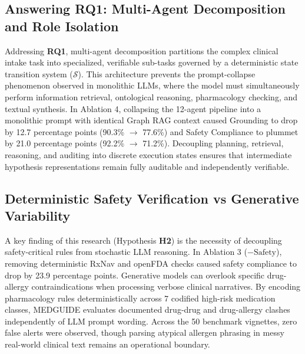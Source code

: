 \documentclass[journal,10pt,twocolumn]{IEEEtran}
\begin{document}
\subsection{Answering RQ1: Multi-Agent Decomposition and Role Isolation}
Addressing \textbf{RQ1}, multi-agent decomposition partitions the complex clinical intake task into specialized, verifiable sub-tasks governed by a deterministic state transition system ($\mathcal{S}$). This architecture prevents the prompt-collapse phenomenon observed in monolithic LLMs, where the model must simultaneously perform information retrieval, ontological reasoning, pharmacology checking, and textual synthesis. In Ablation 4, collapsing the 12-agent pipeline into a monolithic prompt with identical Graph RAG context caused Grounding to drop by 12.7 percentage points (90.3\% $\to$ 77.6\%) and Safety Compliance to plummet by 21.0 percentage points (92.2\% $\to$ 71.2\%). Decoupling planning, retrieval, reasoning, and auditing into discrete execution states ensures that intermediate hypothesis representations remain fully auditable and independently verifiable.

\subsection{Deterministic Safety Verification vs Generative Variability}
A key finding of this research (Hypothesis \textbf{H2}) is the necessity of decoupling safety-critical rules from stochastic LLM reasoning. In Ablation 3 ($- \text{Safety}$), removing deterministic RxNav and openFDA checks caused safety compliance to drop by 23.9 percentage points. Generative models can overlook specific drug-allergy contraindications when processing verbose clinical narratives. By encoding pharmacology rules deterministically across 7 codified high-risk medication classes, MEDGUIDE evaluates documented drug-drug and drug-allergy clashes independently of LLM prompt wording. Across the 50 benchmark vignettes, zero false alerts were observed, though parsing atypical allergen phrasing in messy real-world clinical text remains an operational boundary.
\end{document}
